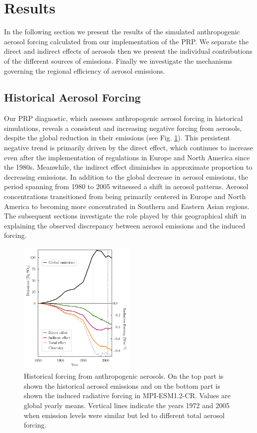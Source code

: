 \documentclass[draft]{agujournal2019}
\begin{document}
\section{Results}
      In the following section we present the results of the simulated anthropogenic aerosol forcing calculated from our implementation of the PRP. We separate the direct and indirect effects of aerosols then we present the individual contributions of the different sources of emissions. Finally we investigate the mechanisms governing the regional efficiency of aerosol emissions.

      \subsection{Historical Aerosol Forcing}
            Our PRP diagnostic, which assesses anthropogenic aerosol forcing in historical simulations, reveals a consistent and increasing negative forcing from aerosols, despite the global reduction in their emissions (see Fig. \ref{fig:figure1}). This persistent negative trend is primarily driven by the direct effect, which continues to increase even after the implementation of regulations in Europe and North America since the 1980s. Meanwhile, the indirect effect diminishes in approximate proportion to decreasing emissions.
            In addition to the global decrease in aerosol emissions, the period spanning from 1980 to 2005 witnessed a shift in aerosol patterns. Aerosol concentrations transitioned from being primarily centered in Europe and North America to becoming more concentrated in Southern and Eastern Asian regions.
            The subsequent sections investigate the role played by this geographical shift in explaining the observed discrepancy between aerosol emissions and the induced forcing.

      \begin{figure}
            \centering
            \noindent\includegraphics[width=0.5\textwidth]{../../figures/figure1}
            \caption{Historical forcing from anthropogenic aerosols. On the top part is shown the historical aerosol emissions and on the bottom part is shown the induced radiative forcing in MPI-ESM1.2-CR. Values are global yearly means. Vertical lines indicate the years 1972 and 2005 when emission levels were similar but led to different total aerosol forcing.}
            \label{fig:figure1}
      \end{figure}
\end{document}
